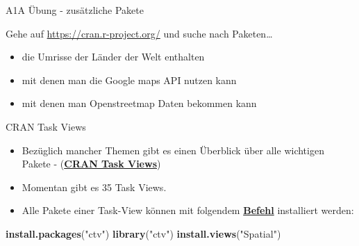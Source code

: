 \documentclass[ignorenonframetext,]{beamer}
\newenvironment{Shaded}{\begin{snugshade}}{\end{snugshade}}
\newcommand{\KeywordTok}[1]{\textcolor[rgb]{0.26,0.66,0.93}{\textbf{#1}}}
\newcommand{\StringTok}[1]{\textcolor[rgb]{0.02,0.61,0.04}{#1}}
\newcommand{\NormalTok}[1]{\textcolor[rgb]{0.74,0.68,0.62}{#1}}
\providecommand{\tightlist}{%
  \setlength{\itemsep}{0pt}\setlength{\parskip}{0pt}}
\begin{document}
\begin{frame}{A1A Übung - zusätzliche Pakete}

Gehe auf \url{https://cran.r-project.org/} und suche nach
Paketen\ldots{}

\begin{itemize}
\tightlist
\item
  die Umrisse der Länder der Welt enthalten
\item
  mit denen man die Google maps API nutzen kann
\item
  mit denen man Openstreetmap Daten bekommen kann
\end{itemize}

\end{frame}

\begin{frame}[fragile]{CRAN Task Views}

\begin{itemize}
\tightlist
\item
  Bezüglich mancher Themen gibt es einen Überblick über alle wichtigen
  Pakete - (\href{https://cran.r-project.org/web/views/}{\textbf{CRAN
  Task Views}})
\item
  Momentan gibt es 35 Task Views.
\item
  Alle Pakete einer Task-View können mit folgendem
  \href{https://mran.microsoft.com/rpackages/}{\textbf{Befehl}}
  installiert werden:
\end{itemize}

\begin{Shaded}
\begin{Highlighting}[]
\KeywordTok{install.packages}\NormalTok{(}\StringTok{"ctv"}\NormalTok{)}
\KeywordTok{library}\NormalTok{(}\StringTok{"ctv"}\NormalTok{)}
\KeywordTok{install.views}\NormalTok{(}\StringTok{"Spatial"}\NormalTok{)}
\end{Highlighting}
\end{Shaded}

\end{frame}
\end{document}
